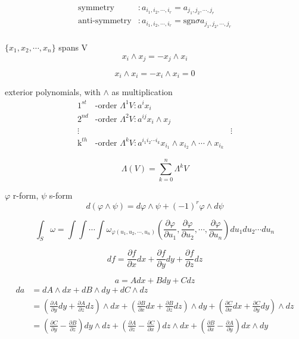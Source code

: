 \documentclass[12pt,a4paper]{article}
\begin{document}
\begin{align*}
	\text{symmetry}&:a_{i_1,i_2, \cdots, i_r} =  a_{j_1,j_2, \cdots, j_r} \\
	\text{anti-symmetry}&:a_{i_1,i_2, \cdots, i_r} =  \mathrm{sgn}\sigma a_{j_1,j_2, \cdots, j_r} \\
\end{align*}


$\{x_1,x_2,\cdots, x_n\}$ spans V 
\[
	x_i \wedge x_j = - x_j \wedge x_i
\]

\[
	x_i \wedge x_i = - x_i \wedge x_i = 0
\]

exterior polynomials, with $\wedge$ as multiplication
\begin{align*}
	\text{1}^{st}&\text{-order } \Lambda^1 V  : a^i x_i \\
	\text{2}^{nd}&\text{-order } \Lambda^2V : a^{ij}x_i \wedge x_j \\
	\vdots&&\vdots\\
	\text{k}^{th}&\text{-order } \Lambda^kV : a^{i_1 i_2 \cdots i_k}x_{i_1} \wedge x_{i_2} \wedge \cdots \wedge x_{i_k}
\end{align*}

\[
	\Lambda(V) = \sum_{k = 0}^{n} \Lambda^k V
\]

$\varphi$ r-form, $\psi$ s-form
\[
	d(\varphi \wedge \psi) = d\varphi \wedge \psi + (-1)^{r} \varphi \wedge d \psi
\]


\[
\int_S \omega = \int\int\cdots\int \omega_{\varphi(u_1,u_2,\cdots,u_n)}\left( 
	\frac{\partial \varphi}{\partial u_1},\frac{\partial \varphi}{\partial u_2},\cdots,\frac{\partial \varphi}{\partial u_n} 
	\right) du_1du_2\cdots du_n
\]


\[
df = \frac{\partial f}{\partial x} dx +\frac{\partial f}{\partial y} dy+\frac{\partial f}{\partial z} dz
\]

\[
a = Adx + Bdy + Cdz
\]
\begin{align*}
da & = dA \wedge dx + dB \wedge dy + dC \wedge dz \\
 & = (\frac{\partial A}{\partial y}dy + \frac{\partial A}{\partial z}dz) \wedge dx 
  + (\frac{\partial B}{\partial x}dx + \frac{\partial B}{\partial z}dz) \wedge dy 
  + (\frac{\partial C}{\partial x}dx + \frac{\partial C}{\partial y}dy) \wedge dz \\
 & = \left(\frac{\partial C}{\partial y} - \frac{\partial B}{\partial z} \right) dy \wedge dz
  + \left(\frac{\partial A}{\partial z} - \frac{\partial C}{\partial x} \right) dz \wedge dx
  + \left(\frac{\partial B}{\partial x} - \frac{\partial A}{\partial y} \right) dx \wedge dy
\end{align*}
\end{document}

